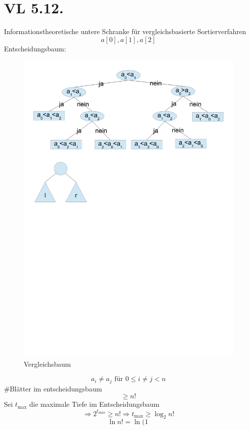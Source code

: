 \documentclass[a4paper,twoside,10pt]{report}
\begin{document}
\chapter{VL 5.12.}
Informationstheoretische untere Schranke für vergleichsbasierte Sortierverfahren\\
\[a[0],a[1],a[2]\]
Entscheidungsbaum:
\begin{figure}[H]\center
\includegraphics[trim= .9cm 20cm .9cm .9cm,clip,width=\columnwidth]{figures/vergleichsbaum.pdf}
\caption{Vergleichsbaum}
\end{figure}
\[a_i\ne a_j \mbox{ für }0\le i\ne j<n\]
\#Blätter im entscheidungsbaum\[\ge n!\]
Sei $t_{\max} $ die maximale Tiefe im Entscheidungsbaum
\[\Rightarrow 2^{t_{\max}}\ge n! \Rightarrow t_{\max} \ge \log_2n!\]
\[\ln n! = \ln (1\,\]
\end{document}
